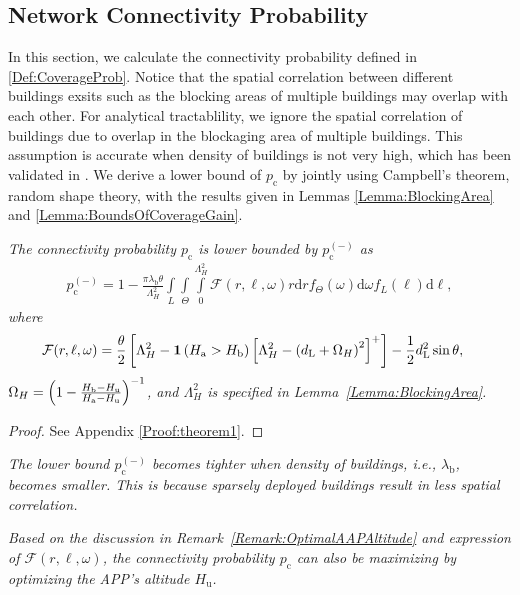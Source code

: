\documentclass[12pt, draftclsnofoot, onecolumn]{IEEEtran}
\begin{document}
\subsection{Network Connectivity Probability}
In this section, we calculate the connectivity probability defined in \eqref{Def:CoverageProb}. Notice that the spatial correlation between different buildings exsits such as the blocking areas of multiple buildings may overlap with each other. For analytical tractablility, we ignore the spatial correlation of buildings due to overlap in the blockaging area of multiple buildings. This assumption is accurate when density of buildings is not very high, which has been validated in \cite{andrews2017modeling}. We derive a lower bound of $p_\mathrm{c}$ by jointly using Campbell's theorem, random shape theory, with the results given in Lemmas \ref{Lemma:BlockingArea} and \ref{Lemma:BoundsOfCoverageGain}.
\begin{theorem}\label{Theorem:ConnectivityProb}\emph{The connectivity probability $p_\mathrm{c}$ is lower bounded by $p_\mathrm{c}^{(-)}$ as
\begin{align}\label{Eq:LowerBoundConnProb}
p_\mathrm{c}^{(-)} =  1 - \frac{\pi \lambda_\mathrm{b}\theta}{\Lambda_H^2} \int\limits_{L} \int\limits_{\Theta} \int\limits_{0}^{\Lambda_H^2} \mathcal{F}(r,\ell, \omega) r \mathrm{d} r  f_{\Theta}(\omega) \mathrm{d} \omega f_{L}(\ell) \mathrm{d} \ell,
\end{align}
where
\begin{align}\label{Eq:FunctionF}
\mathcal{F}(r,\ell, \omega)
&= \frac{\theta}{2} \left[ \Lambda_H^2 - \mathbf{1}\left( H_{\textrm{a}} > H_{\textrm{b}} \right)\left[\Lambda_H^2 - \left( d_\mathrm{L} + \Omega_H \right)^2\right]^{+} \right] - \frac{1}{2}d_\mathrm{L}^2\sin\theta,
\end{align}
$\Omega_H = \left({1 -  \frac{H_{\mathrm{b}} - H_{\mathrm{u}}}{H_{\mathrm{a}} - H_{\mathrm{u}}}}\right)^{-1}$, and  $\Lambda_H^2$ is specified in Lemma~\ref{Lemma:BlockingArea}.}
\end{theorem}
\begin{proof}
See Appendix \ref{Proof:theorem1}.
\end{proof}
\begin{remark}\label{Remark:TightnessOfBound}
\emph{The lower bound $p_\mathrm{c}^{(-)}$ becomes tighter when density of buildings, i.e., $\lambda_\mathrm{b}$, becomes smaller. This is because sparsely deployed buildings result in less spatial correlation.}
\end{remark}
\begin{remark}\label{Remark:OptimalConnProb}
\emph{Based on the discussion in Remark~\ref{Remark:OptimalAAPAltitude} and expression of $\mathcal{F}(r,\ell, \omega)$, the connectivity probability $p_\mathrm{c}$ can also be maximizing by optimizing the APP's altitude $H_\mathrm{u}$.}
\end{remark}
\end{document}
